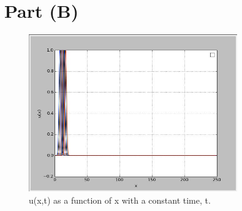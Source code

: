 \documentclass[a4paper]{article}
\begin{document}
\section*{Part (B)}
\begin{figure} [h]
\centering 
\includegraphics[width=90mm]{1}
\caption{u(x,t) as a function of x with a constant time, t.}
\label{fig:1}
\end{figure}
\end{document}
